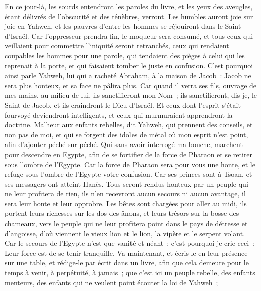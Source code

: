 \begin{multicols}{2}
En ce jour-là, les sourds entendront les paroles du livre, et les yeux des aveugles, étant délivrés de l'obscurité et des ténèbres, verront.
Les humbles auront joie sur joie en Yahweh, et les pauvres d'entre les hommes se réjouiront dans le Saint d'Israël.
Car l'oppresseur prendra fin, le moqueur sera consumé, et tous ceux qui veillaient pour commettre l'iniquité seront retranchés,
ceux qui rendaient coupables les hommes pour une parole, qui tendaient des pièges à celui qui les reprenait à la porte, et qui faisaient tomber le juste en confusion. 
C'est pourquoi ainsi parle Yahweh, lui qui a racheté Abraham, à la maison de Jacob~: Jacob ne sera plus honteux, et sa face ne pâlira plus.
Car quand il verra ses fils, ouvrage de mes mains, au milieu de lui, ils sanctifieront mon Nom~; ils sanctifieront, dis-je, le Saint de Jacob, et ils craindront le Dieu d'Israël.
Et ceux dont l'esprit s'était fourvoyé deviendront intelligents, et ceux qui murmuraient apprendront la doctrine.
\VerseOne{}Malheur aux enfants rebelles, dit Yahweh, qui prennent des conseils, et non pas de moi, et qui se forgent des idoles de métal où mon esprit n'est point, afin d'ajouter péché sur péché.
Qui sans avoir interrogé ma bouche, marchent pour descendre en Egypte, afin de se fortifier de la force de Pharaon et se retirer sous l'ombre de l'Egypte.
Car la force de Pharaon sera pour vous une honte, et le refuge sous l'ombre de l'Egypte votre confusion.
Car ses princes sont à Tsoan, et ses messagers ont atteint Hanès.
Tous seront rendus honteux par un peuple qui ne leur profitera de rien, ils n'en recevront aucun secours ni aucun avantage, il sera leur honte et leur opprobre.
Les bêtes sont chargées pour aller au midi, ils portent leurs richesses sur les dos des ânons, et leurs trésors sur la bosse des chameaux, vers le peuple qui ne leur profitera point dans le pays de détresse et d'angoisse, d'où viennent le vieux lion et le lion, la vipère et le serpent volant.
Car le secours de l'Egypte n'est que vanité et néant~; c'est pourquoi je crie ceci~: Leur force est de se tenir tranquille.
Va maintenant, et écris-le en leur présence sur une table, et rédige-le par écrit dans un livre, afin que cela demeure pour le temps à venir, à perpétuité, à jamais~;
que c'est ici un peuple rebelle, des enfants menteurs, des enfants qui ne veulent point écouter la loi de Yahweh~;

\end{multicols}
